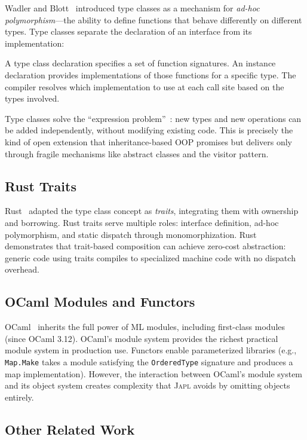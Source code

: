 \documentclass[11pt,a4paper]{article}
\newcommand{\japl}{\textsc{Japl}}
\begin{document}
Wadler and Blott~\citep{wadler1989make} introduced type classes as a mechanism for \emph{ad-hoc polymorphism}---the ability to define functions that behave differently on different types. Type classes separate the declaration of an interface from its implementation:

A type class declaration specifies a set of function signatures. An instance declaration provides implementations of those functions for a specific type. The compiler resolves which implementation to use at each call site based on the types involved.

Type classes solve the ``expression problem''~\citep{wadler1998expression}: new types and new operations can be added independently, without modifying existing code. This is precisely the kind of open extension that inheritance-based OOP promises but delivers only through fragile mechanisms like abstract classes and the visitor pattern.

\subsection{Rust Traits}

Rust~\citep{matsakis2014rust} adapted the type class concept as \emph{traits}, integrating them with ownership and borrowing. Rust traits serve multiple roles: interface definition, ad-hoc polymorphism, and static dispatch through monomorphization. Rust demonstrates that trait-based composition can achieve zero-cost abstraction: generic code using traits compiles to specialized machine code with no dispatch overhead.

\subsection{OCaml Modules and Functors}

OCaml~\citep{leroy2020ocaml} inherits the full power of ML modules, including first-class modules (since OCaml 3.12). OCaml's module system provides the richest practical module system in production use. Functors enable parameterized libraries (e.g., \texttt{Map.Make} takes a module satisfying the \texttt{OrderedType} signature and produces a map implementation). However, the interaction between OCaml's module system and its object system creates complexity that \japl{} avoids by omitting objects entirely.

\subsection{Other Related Work}
\end{document}
